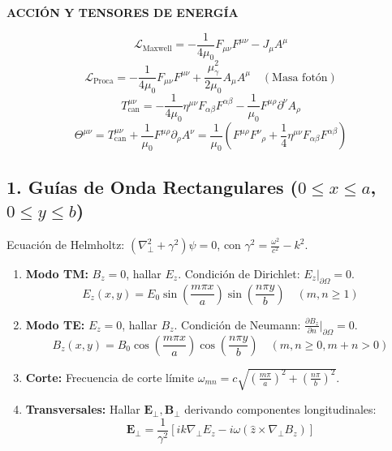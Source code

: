 \documentclass[twocolumn]{article}
\begin{document}
	\begin{center}\textbf{\footnotesize ACCIÓN Y TENSORES DE ENERGÍA}\end{center}
	\vspace{-2mm}
	\begin{equation*}
		\mathcal{L}_{\text{Maxwell}} = -\frac{1}{4\mu_0}F_{\mu\nu}F^{\mu\nu} - J_\mu A^\mu
	\end{equation*}
	\begin{equation*}
		\mathcal{L}_{\text{Proca}} = -\frac{1}{4\mu_0}F_{\mu\nu}F^{\mu\nu} + \frac{\mu_\gamma^2}{2\mu_0}A_\mu A^\mu \quad (\text{Masa fotón})
	\end{equation*}
	\begin{equation*}
		T_{\text{can}}^{\mu\nu} = -\frac{1}{4\mu_0}\eta^{\mu\nu}F_{\alpha\beta}F^{\alpha\beta} - \frac{1}{\mu_0}F^{\mu\rho}\partial^\nu A_\rho
	\end{equation*}
	\begin{equation*}
		\Theta^{\mu\nu} = T_{\text{can}}^{\mu\nu} + \frac{1}{\mu_0}F^{\mu\rho}\partial_\rho A^\nu = \frac{1}{\mu_0}\left(F^{\mu\rho}F^\nu{}_\rho + \frac{1}{4}\eta^{\mu\nu}F_{\alpha\beta}F^{\alpha\beta}\right)
	\end{equation*}
	
	\subsection*{1. Guías de Onda Rectangulares ($0 \le x \le a$, $0 \le y \le b$)}
	Ecuación de Helmholtz: $(\nabla_\perp^2 + \gamma^2) \psi = 0$, con $\gamma^2 = \frac{\omega^2}{c^2} - k^2$.
	\begin{enumerate}
		\item {\bf Modo TM:} $B_z = 0$, hallar $E_z$. Condición de Dirichlet: $E_z|_{\partial\Omega} = 0$.
		$$E_z(x,y) = E_0 \sin\left(\frac{m\pi x}{a}\right)\sin\left(\frac{n\pi y}{b}\right) \quad (m,n \ge 1)$$
		\item {\bf Modo TE:} $E_z = 0$, hallar $B_z$. Condición de Neumann: $\frac{\partial B_z}{\partial n}|_{\partial\Omega} = 0$.
		$$B_z(x,y) = B_0 \cos\left(\frac{m\pi x}{a}\right)\cos\left(\frac{n\pi y}{b}\right) \quad (m,n \ge 0, m+n > 0)$$
		\item {\bf Corte:} Frecuencia de corte límite $\omega_{mn} = c \sqrt{(\frac{m\pi}{a})^2 + (\frac{n\pi}{b})^2}$.
		\item {\bf Transversales:} Hallar $\mathbf{E}_\perp, \mathbf{B}_\perp$ derivando componentes longitudinales:
		$$\mathbf{E}_\perp = \frac{1}{\gamma^2} [ik\nabla_\perp E_z - i\omega(\hat{z}\times\nabla_\perp B_z)]$$
	\end{enumerate}
	
\end{document}
